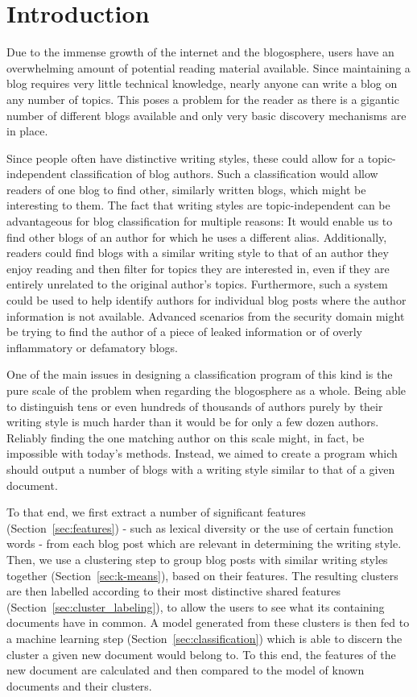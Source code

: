 
\section{Introduction}
\label{sec:introduction}


Due to the immense growth of the internet and the blogosphere, users have an overwhelming amount of potential reading material available.
Since maintaining a blog requires very little technical knowledge, nearly anyone can write a blog on any number of topics.
This poses a problem for the reader as there is a gigantic number of different blogs available and only very basic discovery mechanisms are in place.


Since people often have distinctive writing styles, these could allow for a topic-independent classification of blog authors.
Such a classification would allow readers of one blog to find other, similarly written blogs, which might be interesting to them.
The fact that writing styles are topic-independent can be advantageous for blog classification for multiple reasons: It would enable us to find other blogs of an author for which he uses a different alias.
Additionally, readers could find blogs with a similar writing style to that of an author they enjoy reading and then filter for topics they are interested in, even if they are entirely unrelated to the original author's topics.
Furthermore, such a system could be used to help identify authors for individual blog posts where the author information is not available.
Advanced scenarios from the security domain might be trying to find the author of a piece of leaked information or of overly inflammatory or defamatory blogs.


One of the main issues in designing a classification program of this kind is the pure scale of the problem when regarding the blogosphere as a whole.
Being able to distinguish tens or even hundreds of thousands of authors purely by their writing style is much harder than it would be for only a few dozen authors.
Reliably finding the one matching author on this scale might, in fact, be impossible with today's methods.
Instead, we aimed to create a program which should output a number of blogs with a writing style similar to that of a given document.


To that end, we first extract a number of significant features (Section~\ref{sec:features}) - such as lexical diversity or the use of certain function words - from each blog post which are relevant in determining the writing style.
Then, we use a clustering step to group blog posts with similar writing styles together (Section~\ref{sec:k-means}), based on their features.
The resulting clusters are then labelled according to their most distinctive shared features (Section~\ref{sec:cluster_labeling}), to allow the users to see what its containing documents have in common.
A model generated from these clusters is then fed to a machine learning step (Section~\ref{sec:classification}) which is able to discern the cluster a given new document would belong to.
To this end, the features of the new document are calculated and then compared to the model of known documents and their clusters.


